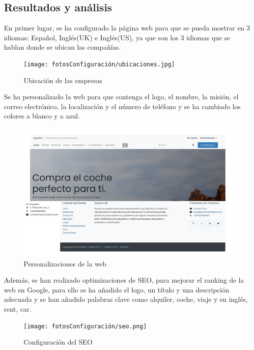 \subsection{Resultados y análisis}
En primer lugar, se ha configurado la página web para que se pueda mostrar en 3 idiomas: Español, Inglés(UK) e Inglés(US), ya que son los 3 idiomas que se hablan donde se ubican las compañías. 
\newpage
\begin{figure}[h]
    \centering
    \texttt{[image: fotosConfiguración/ubicaciones.jpg]}
    \caption{Ubicación de las empresas}
    \label{fig:enter-label}
\end{figure}
Se ha personalizado la web para que contenga el logo, el nombre, la misión, el correo electrónico, la localización y el número de teléfono y se ha cambiado los colores a blanco y a azul.
\begin{figure}[h]
    \centering
    \includegraphics[width=1\linewidth]{fotosConfiguración/personalización.png}
    \caption{Personalizaciones de la web}
    \label{fig:enter-label}
\end{figure}

Además, se han realizado optimizaciones de SEO, para mejorar el ranking de la web en Google, para ello se ha añadido el logo, un título y una descripción adecuada y se han añadido palabras clave como alquiler, coche, viaje y en inglés, rent, car.
\newpage
\begin{figure}[h]
    \centering
    \texttt{[image: fotosConfiguración/seo.png]}
    \caption{Configuración del SEO}
    \label{fig:enter-label}
\end{figure}

